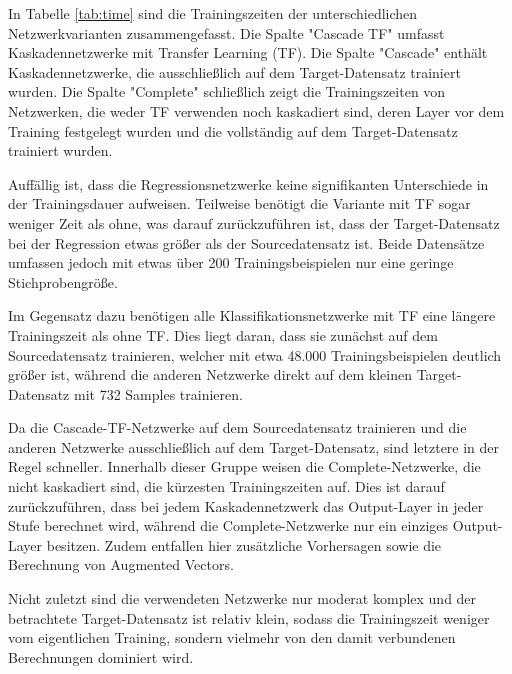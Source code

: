 In Tabelle \ref{tab:time} sind die Trainingszeiten der unterschiedlichen Netzwerkvarianten zusammengefasst. Die Spalte "Cascade TF" umfasst 
Kaskadennetzwerke mit Transfer Learning (TF). Die Spalte "Cascade" enthält Kaskadennetzwerke, die ausschließlich auf dem Target-Datensatz 
trainiert wurden. Die Spalte "Complete" schließlich zeigt die Trainingszeiten von Netzwerken, die weder TF verwenden noch kaskadiert sind, deren 
Layer vor dem Training festgelegt wurden und die vollständig auf dem Target-Datensatz trainiert wurden.

Auffällig ist, dass die Regressionsnetzwerke keine signifikanten Unterschiede in der Trainingsdauer aufweisen. Teilweise benötigt die Variante 
mit TF sogar weniger Zeit als ohne, was darauf zurückzuführen ist, dass der Target-Datensatz bei der Regression etwas größer als der 
Sourcedatensatz ist. Beide Datensätze umfassen jedoch mit etwas über 200 Trainingsbeispielen nur eine geringe Stichprobengröße.

Im Gegensatz dazu benötigen alle Klassifikationsnetzwerke mit TF eine längere Trainingszeit als ohne TF. Dies liegt daran, dass sie zunächst auf 
dem Sourcedatensatz trainieren, welcher mit etwa 48.000 Trainingsbeispielen deutlich größer ist, während die anderen Netzwerke direkt auf dem 
kleinen Target-Datensatz mit 732 Samples trainieren.

Da die Cascade-TF-Netzwerke auf dem Sourcedatensatz trainieren und die anderen Netzwerke ausschließlich auf dem Target-Datensatz, sind letztere 
in der Regel schneller. Innerhalb dieser Gruppe weisen die Complete-Netzwerke, die nicht kaskadiert sind, die kürzesten Trainingszeiten auf. Dies 
ist darauf zurückzuführen, dass bei jedem Kaskadennetzwerk das Output-Layer in jeder Stufe berechnet wird, während die Complete-Netzwerke nur ein 
einziges Output-Layer besitzen. Zudem entfallen hier zusätzliche Vorhersagen sowie die Berechnung von Augmented Vectors.

Nicht zuletzt sind die verwendeten Netzwerke nur moderat komplex und der betrachtete Target-Datensatz ist relativ klein, sodass die Trainingszeit 
weniger vom eigentlichen Training, sondern vielmehr von den damit verbundenen Berechnungen dominiert wird.
